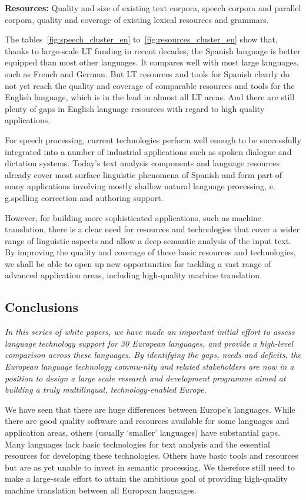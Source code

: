 \begin{multicols}{2}
\textbf{Resources:} Quality and size of existing text corpora, speech corpora and parallel corpora, quality and coverage of existing lexical resources and grammars.

The tables~\ref{fig:speech_cluster_en} to~\ref{fig:resources_cluster_en} show that, thanks to large-scale LT funding in recent decades, the Spanish language is better equipped than most other languages. It compares well with most large languages, such as French and German. But LT resources and tools for Spanish clearly do not yet reach the quality and coverage of comparable resources and tools for the English language, which is in the lead in almost all LT areas. And there are still plenty of gaps in English language resources with regard to high quality applications.

For speech processing, current technologies perform well enough to be successfully integrated into a number of industrial applications such as spoken dialogue and dictation systems. Today’s text analysis components and language resources already cover most surface linguistic phenomena of Spanish and form part of many applications involving mostly shallow natural language processing, e.\,g.spelling correction and authoring support.

However, for building more sophisticated applications, such as machine translation, there is a clear need for resources and technologies that cover a wider range of linguistic aspects and allow a deep semantic analysis of the input text. By improving the quality and coverage of these basic resources and technologies, we shall be able to open up new opportunities for tackling a vast range of advanced application areas, including high-quality machine translation.

\subsection{Conclusions}

\emph{In this series of white papers, we have made an important initial effort to assess language technology support for 30 European languages, and provide a high-level comparison across these languages. By identifying the gaps, needs and deficits, the European language technology commu-nity and related stakeholders are now in a position to design a large scale research and development programme aimed at building a truly multilingual, technology-enabled Europe.}

We have seen that there are huge differences between Europe’s languages. While there are good quality software and resources available for some languages and application areas, others (usually ‘smaller’ languages) have substantial gaps. Many languages lack basic technologies for text analysis and the essential resources for developing these technologies. Others have basic tools and resources but are as yet unable to invest in semantic processing. We therefore still need to make a large-scale effort to attain the ambitious goal of providing high-quality machine translation between all European languages.  


\end{multicols}
